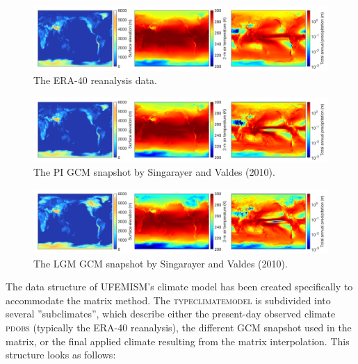 \documentclass{article}
\begin{document}
\begin{figure}[h!] \label{fig:climate_ERA40}
  \includegraphics[width=0.95\linewidth]{Fig_climate_ERA40.png}
  \caption{The ERA-40 reanalysis data.}
\end{figure}

\begin{figure}[h!] \label{fig:climate_GCM_PI}
  \includegraphics[width=0.95\linewidth]{Fig_climate_GCM_PI.png}
  \caption{The PI GCM snapshot by Singarayer and Valdes (2010).}
\end{figure}

\begin{figure}[h!] \label{fig:climate_GCM_LGM}
  \includegraphics[width=0.95\linewidth]{Fig_climate_GCM_LGM.png}
  \caption{The LGM GCM snapshot by Singarayer and Valdes (2010).}
\end{figure}

The data structure of UFEMISM's climate model has been created specifically to accommodate the matrix method. The \textsc{type\textunderscore climate\textunderscore model} is subdivided into several ''subclimates'', which describe either the present-day observed climate \textsc{pd\textunderscore obs} (typically the ERA-40 reanalysis), the different GCM snapshot used in the matrix, or the final applied climate resulting from the matrix interpolation. This structure looks as follows:
\end{document}
